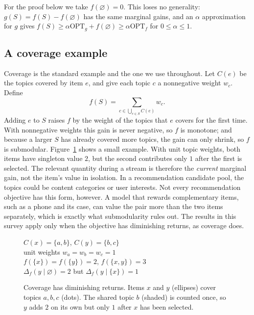 \documentclass[10pt]{article}
\newcommand{\OPT}{\mathrm{OPT}}
\newcommand{\marg}[2]{\Delta_f(#1\mid #2)}
\begin{document}
For the proof below we take $f(\varnothing)=0$. This loses no generality: $g(S)=f(S)-f(\varnothing)$ has the same marginal gains, and an $\alpha$ approximation for $g$ gives $f(S)\geq\alpha\OPT_g+f(\varnothing)\geq\alpha\OPT_f$ for $0\leq\alpha\leq1$.

\subsection{A coverage example}
Coverage is the standard example and the one we use throughout. Let $C(e)$ be the topics covered by item $e$, and give each topic $c$ a nonnegative weight $w_c$. Define
\begin{equation}
  f(S)=\sum_{c\in\bigcup_{e\in S}C(e)} w_c.
  \label{eq:coverage}
\end{equation}
Adding $e$ to $S$ raises $f$ by the weight of the topics that $e$ covers for the first time. With nonnegative weights this gain is never negative, so $f$ is monotone; and because a larger $S$ has already covered more topics, the gain can only shrink, so $f$ is submodular. Figure~\ref{fig:coverage} shows a small example. With unit topic weights, both items have singleton value $2$, but the second contributes only $1$ after the first is selected. The relevant quantity during a stream is therefore the \emph{current} marginal gain, not the item's value in isolation. In a recommendation candidate pool, the topics could be content categories or user interests. Not every recommendation objective has this form, however. A model that rewards complementary items, such as a phone and its case, can value the pair more than the two items separately, which is exactly what submodularity rules out. The results in this survey apply only when the objective has diminishing returns, as coverage does.

\begin{figure}[ht]
\centering
{}
\qquad
\begin{minipage}[c]{0.40\linewidth}
\small
$C(x)=\{a,b\}$, \quad $C(y)=\{b,c\}$\\[4pt]
unit weights $w_a=w_b=w_c=1$\\[4pt]
$f(\{x\})=f(\{y\})=2$, \quad $f(\{x,y\})=3$\\[4pt]
$\marg{y}{\varnothing}=2$ \quad but \quad $\marg{y}{\{x\}}=1$
\end{minipage}
\caption{Coverage has diminishing returns. Items $x$ and $y$ (ellipses) cover topics $a,b,c$ (dots). The shared topic $b$ (shaded) is counted once, so $y$ adds $2$ on its own but only $1$ after $x$ has been selected.}
\label{fig:coverage}
\end{figure}
\end{document}
